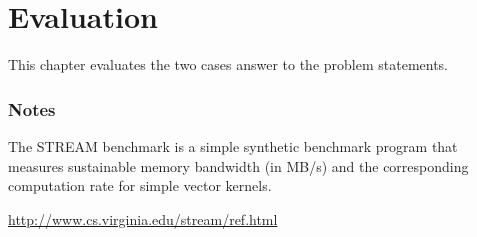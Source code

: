 \chapter{Evaluation}

This chapter evaluates the two cases answer to the problem statements.


\subsection*{Notes}

The STREAM benchmark is a simple synthetic benchmark program that measures sustainable memory bandwidth (in MB/s) and the corresponding computation rate for simple vector kernels. 

\url{http://www.cs.virginia.edu/stream/ref.html}